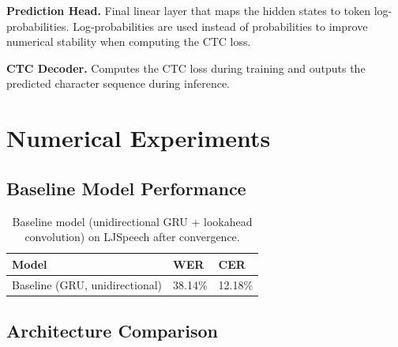 \documentclass{article}
\begin{document}
\textbf{Prediction Head.}
Final linear layer that maps the hidden states to token log-probabilities. Log-probabilities are used instead of probabilities to improve numerical stability when computing the CTC loss.

\textbf{CTC Decoder.}
Computes the CTC loss during training and outputs the predicted character sequence during inference.









\section{Numerical Experiments}

\subsection{Baseline Model Performance}

\begin{table}[h]
  \caption{Baseline model (unidirectional GRU + lookahead convolution) on LJSpeech after convergence.}
  \label{tab:baseline}
  \centering
  \begin{tabular}{lll}
    \toprule
    Model                        & WER     & CER     \\
    \midrule
    Baseline (GRU, unidirectional) & 38.14\% & 12.18\% \\
    \bottomrule
  \end{tabular}
\end{table}

\subsection{Architecture Comparison}
\end{document}
